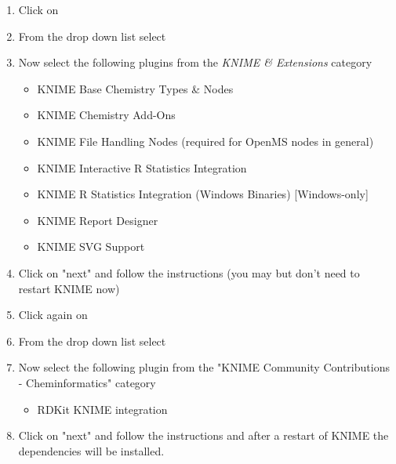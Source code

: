 \begin{enumerate}
\item Click on 
\item From the  drop down list select \menu{\KnimeUpdateSite}
\item Now select the following plugins from the \textit{KNIME \& Extensions} category
    \begin{itemize}
    \item KNIME Base Chemistry Types \& Nodes
    \item KNIME Chemistry Add-Ons
    \item KNIME File Handling Nodes (required for OpenMS nodes in general)
    \item KNIME Interactive R Statistics Integration
    \item KNIME R Statistics Integration (Windows Binaries) [Windows-only]
    \item KNIME Report Designer
    \item KNIME SVG Support
    \end{itemize}
\item Click on "next" and follow the instructions (you may but don't need to restart KNIME now)
\item Click again on 
\item From the  drop down list select \\\menu{\KnimeTrustedSite}
\item Now select the following plugin from the "KNIME Community Contributions - Cheminformatics" category 	
    \begin{itemize}
    \item     RDKit KNIME integration
    \end{itemize}	
\item Click on "next" and follow the instructions and after a restart of KNIME the dependencies will be installed.
\end{enumerate}

